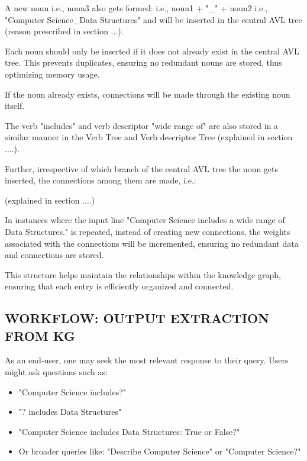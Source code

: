 \documentclass[conference]{IEEEtran}
\begin{document}
A new noun i.e., noun3 also gets formed: i.e., noun1 + "\_" + noun2 i.e., "Computer Science\_Data Structures"
and will be inserted in the central AVL tree (reason prescribed in section ...).

Each noun should only be inserted if it does not already exist in the central AVL tree. 
This prevents duplicates, ensuring no redundant nouns are stored, thus optimizing memory usage.

If the noun already exists, connections will be made through the existing noun itself.

The verb "includes" and verb descriptor "wide range of" are also stored in a similar manner
in the Verb Tree and Verb descriptor Tree (explained in section ....).

Further, irrespective of which branch of the central AVL tree the noun gets inserted, 
the connections among them are made, i.e.:


(explained in section ....)

In instances where the input line "Computer Science includes a wide range of Data Structures." is 
repeated, instead of creating new connections, the weights associated with the connections 
will be incremented, ensuring no redundant data and connections are stored.

This structure helps maintain the relationships within the knowledge graph, 
ensuring that each entry is efficiently organized and connected.


\subsection*{WORKFLOW: OUTPUT EXTRACTION FROM KG}

As an end-user, one may seek the most relevant response to their query. Users might ask questions such as:
\begin{itemize}
    \item "Computer Science includes?"
    \item "? includes Data Structures"
    \item "Computer Science includes Data Structures: True or False?"
    \item Or broader queries like: "Describe Computer Science" or "Computer Science?"
\end{itemize}
\end{document}

